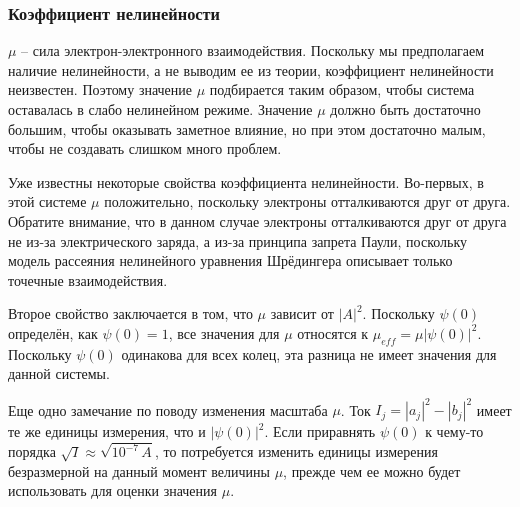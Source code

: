 \documentclass[A4,12pt,oneside]{article}
\renewcommand{\(}{\left(}
\renewcommand{\)}{\right)}
\begin{document}
\subsubsection{Коэффициент нелинейности}

$\mu$ -- сила электрон-электронного взаимодействия. 
Поскольку мы предполагаем наличие нелинейности, а не выводим ее из теории, коэффициент нелинейности неизвестен. Поэтому значение $\mu$ подбирается таким образом, чтобы система оставалась в слабо нелинейном режиме. Значение $\mu$ должно быть достаточно большим, чтобы оказывать заметное влияние, но при этом достаточно малым, чтобы не создавать слишком много проблем. 

Уже известны некоторые свойства коэффициента нелинейности. Во-первых, в этой системе $\mu$ положительно, поскольку электроны отталкиваются друг от друга. Обратите внимание, что в данном случае электроны отталкиваются друг от друга не из-за электрического заряда, а из-за принципа запрета Паули, поскольку модель рассеяния нелинейного уравнения Шрёдингера описывает только точечные взаимодействия.   

Второе свойство заключается в том, что $\mu$ зависит от $\left|A\right|^{2}$. Поскольку $\psi\left(0\right)$ определён, как $\psi\left(0\right)=1$, все значения для $\mu$ относятся к $\mu_{eff} = \mu \left|\psi\left(0\right)\right|^2$. Поскольку $\psi\left(0\right)$ одинакова для всех колец, эта разница не имеет значения для данной системы.

Еще одно замечание по поводу изменения масштаба $\mu$. Ток $I_j = \left|a_j\right|^2 - \left|b_j\right|^2$ имеет те же единицы измерения, что и $\left|\psi\left(0\right)\right|^2$. Если приравнять $\psi\left(0\right)$ к чему-то порядка $\sqrt{I} \approx \sqrt{10^{-7}\, A}$, то потребуется изменить единицы измерения безразмерной на данный момент величины $\mu$, прежде чем ее можно будет использовать для оценки значения $\mu$.

\end{document}
